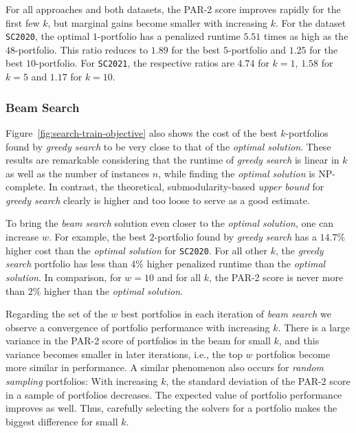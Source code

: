 \documentclass[conference]{IEEEtran}
\begin{document}
For all approaches and both datasets, the PAR-2 score improves rapidly for the first few $k$, but marginal gains become smaller with increasing $k$.
For the dataset \texttt{SC2020}, the optimal $1$-portfolio has a penalized runtime $5.51$ times as high as the $48$-portfolio.
This ratio reduces to $1.89$ for the best $5$-portfolio and $1.25$ for the best $10$-portfolio.
For \texttt{SC2021}, the respective ratios are $4.74$ for $k=1$, $1.58$ for $k=5$ and $1.17$ for $k=10$.

\subsubsection{Beam Search}

Figure~\ref{fig:search-train-objective} also shows the cost of the best $k$-portfolios found by \emph{greedy search} to be very close to that of the \emph{optimal solution}.
These results are remarkable considering that the runtime of \emph{greedy search} is linear in $k$ as well as the number of instances $n$, while finding the \emph{optimal solution} is NP-complete.
In contrast, the theoretical, submodularity-based \emph{upper bound} for \emph{greedy search} clearly is higher and too loose to serve as a good estimate.

To bring the \emph{beam search} solution even closer to the \emph{optimal solution}, one can increase $w$.
For example, the best $2$-portfolio found by \emph{greedy search} has a $14.7\%$ higher cost than the \emph{optimal solution} for \texttt{SC2020}.
For all other $k$, the \emph{greedy search} portfolio has less than $4\%$ higher penalized runtime than the \emph{optimal solution}.
In comparison, for $w=10$ and for all $k$, the PAR-2 score is never more than $2\%$ higher than the \emph{optimal solution}.

Regarding the set of the $w$ best portfolios in each iteration of \emph{beam search} we observe a convergence of portfolio performance with increasing $k$. 
There is a large variance in the PAR-2 score of portfolios in the beam for small $k$, and this variance becomes smaller in later iterations, i.e., the top $w$ portfolios become more similar in performance.
A similar phenomenon also occurs for \emph{random sampling} portfolios:
With increasing $k$, the standard deviation of the PAR-2 score in a sample of portfolios decreases.
The expected value of portfolio performance improves as well.
Thus, carefully selecting the solvers for a portfolio makes the biggest difference for small $k$.
\end{document}
